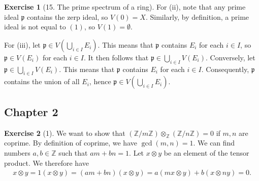 \documentclass{article}
\theoremstyle{definition}
\newtheorem*{exercise}{Exercise}
\begin{document}
\begin{exercise}[15. The prime spectrum of a ring]
    For (ii), note that any prime ideal $\mathfrak{p}$ contains the
    zerp ideal, so $V(0) = X$. Similarly, by definition, a prime ideal
    is not equal to $(1)$, so $V(1) = \emptyset$.

    For (iii), let $\mathfrak{p} \in V\left(\bigcup_{i \in I}
    E_i\right)$. This means that $\mathfrak{p}$ contains $E_i$ for
    each $i \in I$, so $\mathfrak{p} \in V(E_i)$ for each $i \in I$.
    It then follows that $\mathfrak{p} \in \bigcup_{i \in I} V(E_i)$.
    Conversely, let $\mathfrak{p} \in \bigcup_{i \in I} V(E_i)$. This
    means that $\mathfrak{p}$ contains $E_i$ for each $i \in I$.
    Consequently, $\mathfrak{p}$ contains the union of all $E_i$,
    hence $\mathfrak{p} \in V\left(\bigcup_{i \in I} E_i \right)$.
\end{exercise}

\subsection{Chapter 2}
\label{sec:chapter_2}

\begin{exercise}[1]
    We want to show that $\left( \mathbb{Z}/m\mathbb{Z}
    \right)\otimes_{\mathbb{Z}}  \left( \mathbb{Z} / n\mathbb{Z} \right) =
    0$ if $m, n$ are coprime. By definition of coprime, we have $\gcd(m, n)
    = 1$. We can find numbers $a, b \in \mathbb{Z}$ such that $am + bn =
    1$. Let $x \otimes y$ be an element of the tensor product. We therefore
    have
    \begin{align*}
        x \otimes y = 1 \left( x \otimes y \right) = (am + bn)(x
        \otimes y) = a(mx \otimes y) + b(x \otimes ny) = 0.
    \end{align*}
\end{exercise}
\end{document}
